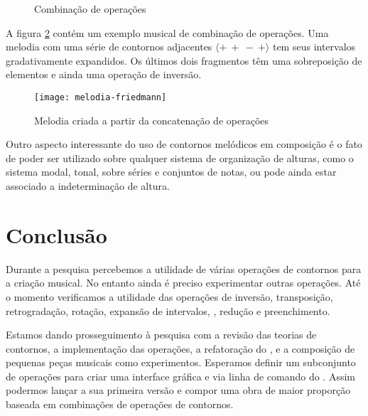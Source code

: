 \begin{figure}
  \centering
  \caption{Combinação de operações}
  \label{fig:combinacao-operacoes}
\end{figure}

A figura \ref{fig:melodia-concatenacao-operacoes} contém um exemplo
musical de combinação de operações. Uma melodia com uma série de
contornos adjacentes  $\langle+\:+\:-\:+\rangle$ tem seus
intervalos gradativamente expandidos. Os últimos dois fragmentos têm
uma sobreposição de elementos e ainda uma operação de inversão.

\begin{figure}
  \centering
  \texttt{[image: melodia-friedmann]}
  \caption{Melodia criada a partir da concatenação de operações}
  \label{fig:melodia-concatenacao-operacoes}
\end{figure}

Outro aspecto interessante do uso de contornos melódicos em composição
é o fato de poder ser utilizado sobre qualquer sistema de organização
de alturas, como o sistema modal, tonal, sobre séries e conjuntos de
notas, ou pode ainda estar associado a indeterminação de altura.

\section{Conclusão}
\label{sec:conclusao}

Durante a pesquisa percebemos a utilidade de várias operações de
contornos para a criação musical. No entanto ainda é preciso
experimentar outras operações. Até o momento verificamos a utilidade
das operações de inversão, transposição, retrogradação, rotação,
expansão de intervalos, , redução e preenchimento.

Estamos dando prosseguimento à pesquisa com a revisão das teorias de
contornos, a implementação das operações, a refatoração do \goiaba{},
e a composição de pequenas peças musicais como experimentos. Esperamos
definir um subconjunto de operações para criar uma interface gráfica e
via linha de comando do \goiaba{}. Assim podermos lançar a sua
primeira versão e compor uma obra de maior proporção baseada em
combinações de operações de contornos.
